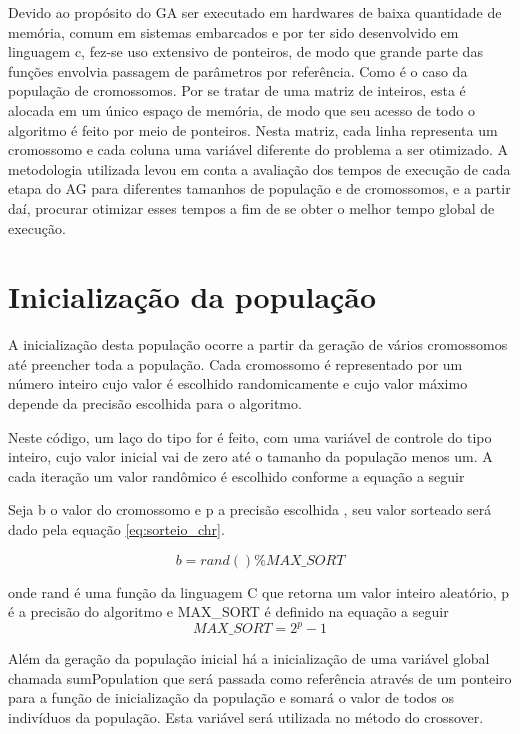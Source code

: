 \documentclass[
    12pt,               %
    twoside,            %
    a4paper,            %
    english,            %
    french,             %
    spanish,            %
    brazil,             %
    ]{abntex2}
\begin{document}
  Devido ao propósito do GA ser executado em hardwares de baixa quantidade de memória, comum em sistemas embarcados e por ter sido desenvolvido em linguagem c, fez-se uso extensivo de ponteiros, de modo que grande parte das funções envolvia passagem de parâmetros por referência. Como é o caso da população de cromossomos. Por se tratar de uma matriz de inteiros, esta é alocada em um único espaço de memória, de modo que seu acesso de todo o algoritmo é feito por meio de ponteiros. Nesta matriz, cada linha representa um cromossomo e cada coluna uma variável diferente do problema a ser otimizado.
  A metodologia utilizada levou em conta a avaliação dos tempos de execução de cada etapa do AG para diferentes tamanhos de população e de cromossomos, e a partir daí, procurar otimizar esses tempos a fim de se obter o melhor tempo global de execução.

\section{Inicialização da população}

  A inicialização desta população ocorre a partir da geração de vários cromossomos até preencher toda a população. Cada cromossomo é representado por um número inteiro cujo valor é escolhido randomicamente e cujo valor máximo depende da precisão escolhida para o algoritmo. 

  Neste código, um laço do tipo for é feito, com uma variável de controle do tipo inteiro, cujo valor inicial vai de zero até o tamanho da população menos um. A cada iteração um valor randômico é escolhido conforme a equação  a seguir

  Seja b o valor do cromossomo e p a precisão escolhida , seu valor sorteado será dado pela equação \ref{eq:sorteio_chr}.

  \begin{equation}  
    b = rand() \% MAX\_SORT
    \label{eq:sorteio_chr}
  \end{equation}

  onde rand é uma função da linguagem C que retorna um valor inteiro aleatório, p é a precisão do algoritmo e  MAX\_SORT é definido na equação a seguir 
  \begin{equation}
    MAX\_SORT = 2^p-1
    \label{eq: sort_max}
  \end{equation}

  Além da geração da população inicial há a inicialização de uma variável global chamada sumPopulation que será passada como referência através de um ponteiro para a função de inicialização da população e somará o valor de todos os indivíduos da população. Esta variável será utilizada no método do crossover.
\end{document}
